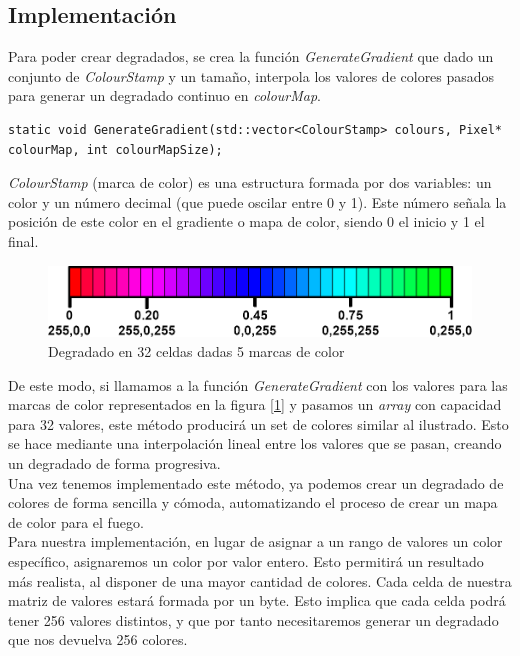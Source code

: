 \subsection{Implementación}

Para poder crear degradados, se crea la función \emph{GenerateGradient} que dado un conjunto de \emph{ColourStamp} y un tamaño, interpola los valores de colores pasados para generar un degradado continuo en \emph{colourMap}.\\

\begin{lstlisting}[style=C-color, caption={Método para crear gradientes de color},label=cod:generateGradient]
static void GenerateGradient(std::vector<ColourStamp> colours, Pixel* colourMap, int colourMapSize);
\end{lstlisting}

\emph{ColourStamp} (marca de color) es una estructura formada por dos variables: un color y un número decimal (que puede oscilar entre 0 y 1). Este número señala la posición de este color en el gradiente o mapa de color, siendo 0 el inicio y 1 el final. 

\begin{figure}[h]
	\centering
	\includegraphics[width=12cm]{archivos/colourGradient}
	\caption{Degradado en 32 celdas dadas 5 marcas de color}
	\label{fig:colourGradient}
\end{figure}

De este modo, si llamamos a la función \emph{GenerateGradient} con los valores para las marcas de color representados en la figura [\ref{fig:colourGradient}] y pasamos un \emph{array} con capacidad para 32 valores, este método producirá un set de colores similar al ilustrado. Esto se hace mediante una interpolación lineal entre los valores que se pasan, creando un degradado de forma progresiva.\\

Una vez tenemos implementado este método, ya podemos crear un degradado de colores de forma sencilla y cómoda, automatizando el proceso de crear un mapa de color para el fuego.\\

Para nuestra implementación, en lugar de asignar a un rango de valores un color específico, asignaremos un color por valor entero. Esto permitirá un resultado más realista, al disponer de una mayor cantidad de colores. Cada celda de nuestra matriz de valores estará formada por un byte. Esto implica que cada celda podrá tener 256 valores distintos, y que por tanto necesitaremos generar un degradado que nos devuelva 256 colores.\\

